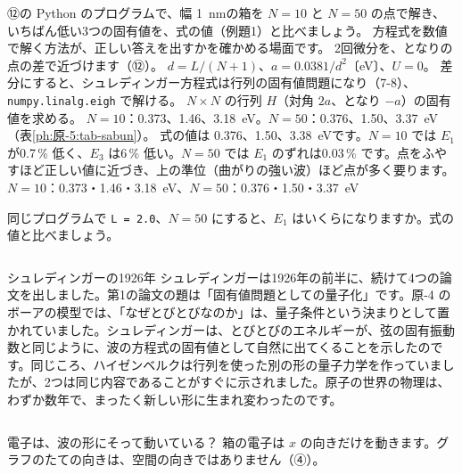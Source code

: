 \label{ph:原-5:ex12}
\begin{phreidai}[差分法で箱の電子を解く]
⑫の Python のプログラムで、幅 \qty{1}{nm}の箱を $N=10$ と $N=50$ の点で解き、いちばん低い3つの固有値を、式の値（例題1）と比べましょう。
\phbamen
方程式を数値で解く方法が、正しい答えを出すかを確かめる場面です。
\phmushi
2回微分を、となりの点の差で近づけます（⑫）。
\phzu
$d=L/(N+1)$、$a=0.0381/d^2$〔eV〕、$U=0$。
\phriyu
差分にすると、シュレディンガー方程式は行列の固有値問題になり（7-8）、\texttt{numpy.linalg.eigh} で解ける。
\phtateru
$N\times N$ の行列 $H$（対角 $2a$、となり $-a$）の固有値を求める。
\phtoku
$N=10$：0.373、1.46、\qty{3.18}{eV}。$N=50$：0.376、1.50、\qty{3.37}{eV}（表\ref{ph:原-5:tab-sabun}）。
\phtashikame
式の値は 0.376、1.50、\qty{3.38}{eV}です。$N=10$ では $E_1$ が0.7\,\% 低く、$E_3$ は6\,\% 低い。$N=50$ では $E_1$ のずれは0.03\,\% です。点をふやすほど正しい値に近づき、上の準位（曲がりの強い波）ほど点が多く要ります。
\kotae $N=10$：0.373・1.46・\qty{3.18}{eV}、$N=50$：0.376・1.50・\qty{3.37}{eV}
\end{phreidai}
\begin{jibun}
同じプログラムで \texttt{L = 2.0}、$N=50$ にすると、$E_1$ はいくらになりますか。式の値と比べましょう。
\end{jibun}

\begin{column}{シュレディンガーの1926年}
シュレディンガーは1926年の前半に、続けて4つの論文を出しました。第1の論文の題は「固有値問題としての量子化」です。原-4 のボーアの模型では、「なぜとびとびなのか」は、量子条件という決まりとして置かれていました。シュレディンガーは、とびとびのエネルギーが、弦の固有振動数と同じように、波の方程式の固有値として自然に出てくることを示したのです。同じころ、ハイゼンベルクは行列を使った別の形の量子力学を作っていましたが、2つは同じ内容であることがすぐに示されました。原子の世界の物理は、わずか数年で、まったく新しい形に生まれ変わったのです。
\end{column}

\begin{tsumazuki}{電子は、波の形にそって動いている？}
箱の電子は $x$ の向きだけを動きます。グラフのたての向きは、空間の向きではありません（④）。
\end{tsumazuki}


